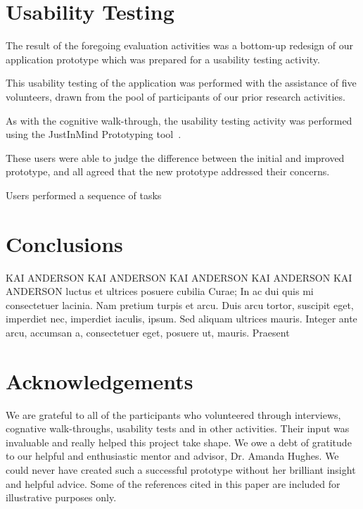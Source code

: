 \documentclass{sigchi-ext}
\begin{document}
\section{Usability Testing}

The result of the foregoing evaluation activities was a bottom-up redesign of
our application prototype which was prepared for a usability testing activity.

This usability testing of the application was performed with the assistance of
five volunteers, drawn from the pool of participants of our prior research activities.

As with the cognitive walk-through, the usability testing activity was
performed using the JustInMind Prototyping tool~\cite{justinmind}. 

These users were able to judge the difference between the initial and
improved prototype, and all agreed that the new prototype addressed their
concerns.

Users performed a sequence of tasks




\section{Conclusions}
KAI ANDERSON KAI ANDERSON KAI ANDERSON KAI ANDERSON KAI ANDERSON
luctus et ultrices posuere cubilia Curae; In ac dui quis mi
consectetuer lacinia.
Nam pretium turpis et arcu. Duis arcu tortor, suscipit eget, imperdiet
nec, imperdiet iaculis, ipsum. Sed aliquam ultrices mauris. Integer
ante arcu, accumsan a, consectetuer eget, posuere ut, mauris. Praesent



\section{Acknowledgements}
We are grateful to all of the participants who volunteered through interviews,
cognative walk-throughs, usability tests and in other activities. Their input
was invaluable and really helped this project take shape.
We owe a debt of gratitude to our helpful and enthusiastic mentor and advisor,
Dr. Amanda Hughes. We could never have created such a successful prototype
without her brilliant insight and helpful advice.
Some of the references cited in this paper are included for illustrative purposes only.



\balance{}

% 

% 

\end{document}

